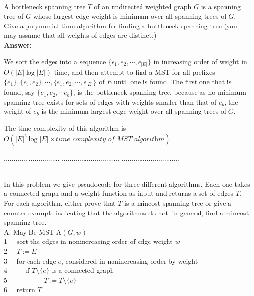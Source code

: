 \documentclass[a4paper,11pt]{article}
\begin{document}
\\
A bottleneck spanning tree $T$ of an undirected weighted graph $G$ is a spanning tree of $G$
whose largest edge weight is minimum over all spanning trees of $G$. 
Give a polynomial time algorithm for finding a bottleneck spanning tree 
(you may assume that all weights of edges are distinct.)\\
{\bf Answer:} \par
    We sort the edges into a sequence $\{ e_1, e_2, \cdots, e_{|E|} \}$ in increasing order of weight in $O(|E| \log |E|)$ time, and then attempt to find a MST for all prefixes $\{ e_1 \}, \{ e_1, e_2 \}, \cdots, \{ e_1, e_2, \cdots, e_{|E|} \}$ of $E$ until one is found. The first one that is found, say $\{ e_1, e_2, \cdots e_b \}$, is the bottleneck spanning tree, because as no minimum spanning tree exists for sets of edges with weights smaller than that of $e_b$, the weight of $e_b$ is the minimum largest edge weight over all spanning trees of $G$. \par
    The time complexity of this algorithm is $O(|E|^2 \log |E| \times \textit{time complexity of MST algorithm})$.

\pagebreak

 $.............................$
 $..............................$
          $..............................$\\

\bigskip

\\
In this problem we give pseudocode for three different algorithms. Each one takes a connected graph and a weight function as input
and returns a set of edges $T$. For each algorithm, either prove that $T$ is a mincost spanning tree or give a counter-example indicating that the algorithms do not, in general, find a mincost spanning tree. \\

\noindent
A. May-Be-MST-A$(G,w)$\\
1 $~~~$ sort the edges in nonincreasing order of edge weight $w$\\
2 $~~~$ $T:=E$\\
3 $~~~$ for each edge $e$, considered in nonincreasing order by weight\\
4 $~~~~~~~~~$ if $T \setminus \{ e \}$ is a connected graph\\
5 $~~~~~~~~~~~~~~~~~~~~~$ $T := T \setminus \{ e \}$\\
6 $~~~$ return $T$\\
\end{document}
